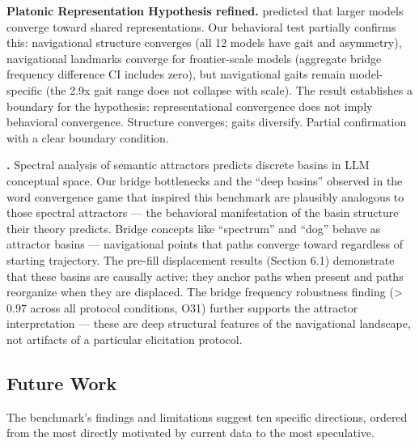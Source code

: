 \textbf{Platonic Representation Hypothesis refined.} \citet{huh2024platonic} predicted that larger models converge toward shared representations. Our behavioral test partially confirms this: navigational structure converges (all 12 models have gait and asymmetry), navigational landmarks converge for frontier-scale models (aggregate bridge frequency difference CI includes zero), but navigational gaits remain model-specific (the 2.9x gait range does not collapse with scale). The result establishes a boundary for the hypothesis: representational convergence does not imply behavioral convergence. Structure converges; gaits diversify. Partial confirmation with a clear boundary condition.

\textbf{\citet{wyss2025spectral}.} Spectral analysis of semantic attractors predicts discrete basins in LLM conceptual space. Our bridge bottlenecks and the ``deep basins'' observed in the word convergence game that inspired this benchmark \citep{hodge2025convergence} are plausibly analogous to those spectral attractors --- the behavioral manifestation of the basin structure their theory predicts. Bridge concepts like ``spectrum'' and ``dog'' behave as attractor basins --- navigational points that paths converge toward regardless of starting trajectory. The pre-fill displacement results (Section 6.1) demonstrate that these basins are causally active: they anchor paths when present and paths reorganize when they are displaced. The bridge frequency robustness finding (\textgreater{} 0.97 across all protocol conditions, O31) further supports the attractor interpretation --- these are deep structural features of the navigational landscape, not artifacts of a particular elicitation protocol.

\subsection{Future Work}\label{future-work}

The benchmark's findings and limitations suggest ten specific directions, ordered from the most directly motivated by current data to the most speculative.

